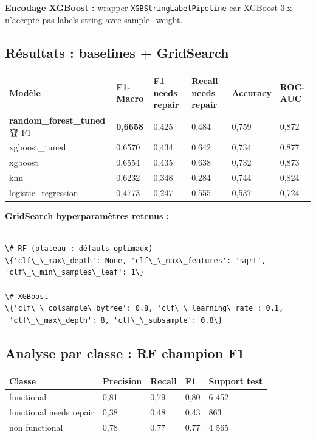 \documentclass[11pt,a4paper]{report}
\begin{document}
\textbf{Encodage XGBoost :} wrapper \texttt{XGBStringLabelPipeline} car XGBoost 3.x n'accepte pas labels string avec sample\_weight.

\subsection{Résultats : baselines + GridSearch}

{\small
\begin{longtable}{@{}llllll@{}}
\toprule
\rowcolor{EHTPTableHead}Modèle & F1-Macro & F1 needs repair & Recall needs repair & Accuracy & ROC-AUC \\
\midrule
\textbf{random\_forest\_tuned} 🏆 F1 & \textbf{0,6658} & 0,425 & 0,484 & 0,759 & 0,872 \\
xgboost\_tuned & 0,6570 & 0,434 & 0,642 & 0,734 & 0,877 \\
xgboost & 0,6554 & 0,435 & 0,638 & 0,732 & 0,873 \\
knn & 0,6232 & 0,348 & 0,284 & 0,744 & 0,824 \\
logistic\_regression & 0,4773 & 0,247 & 0,555 & 0,537 & 0,724 \\
\bottomrule
\end{longtable}
}

\textbf{GridSearch hyperparamètres retenus :}

\begin{lstlisting}

\# RF (plateau : défauts optimaux)
\{'clf\_\_max\_depth': None, 'clf\_\_max\_features': 'sqrt', 'clf\_\_min\_samples\_leaf': 1\}

\# XGBoost
\{'clf\_\_colsample\_bytree': 0.8, 'clf\_\_learning\_rate': 0.1,
 'clf\_\_max\_depth': 8, 'clf\_\_subsample': 0.8\}

\end{lstlisting}

\subsection{Analyse par classe : RF champion F1}

{\small
\begin{longtable}{@{}lllll@{}}
\toprule
\rowcolor{EHTPTableHead}Classe & Precision & Recall & F1 & Support test \\
\midrule
functional & 0,81 & 0,79 & 0,80 & 6 452 \\
functional needs repair & 0,38 & 0,48 & 0,43 & 863 \\
non functional & 0,78 & 0,77 & 0,77 & 4 565 \\
\bottomrule
\end{longtable}
}
\end{document}
